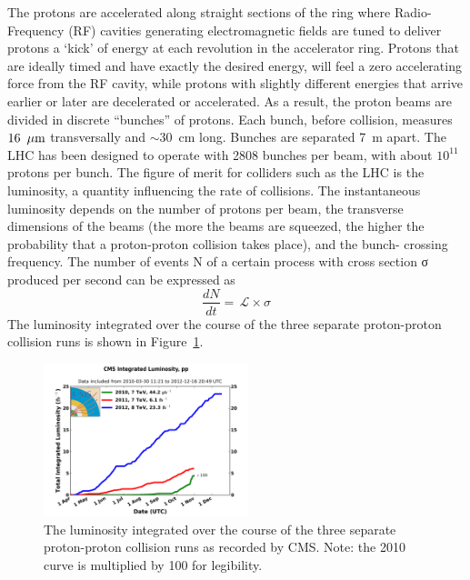 \indent The protons are accelerated along straight sections of the ring where 
Radio-Frequency (RF) cavities generating electromagnetic fields are 
tuned to deliver protons a ‘kick’ of energy at each revolution in the accelerator ring. 
Protons that are ideally timed and have exactly the desired energy, will feel 
a zero accelerating force from the RF cavity, while protons with slightly different 
energies that arrive earlier or later are decelerated or accelerated. As a result, 
the proton beams are divided in discrete ``bunches'' of protons. Each bunch, before collision,
measures $16~\,\mu\text{m}$ transversally and $\sim\!\!30$~cm long. Bunches are separated 7~m apart.
The LHC has been designed to operate with 2808 bunches per beam, with about $10^{11}$ protons per bunch. 
The figure of merit for colliders such as the LHC is the luminosity, a quantity 
influencing the rate of collisions. The instantaneous luminosity depends on the number of protons
per beam, the transverse dimensions of the beams (the more the beams are squeezed,
the higher the probability that a proton-proton collision takes place), and the bunch-
crossing frequency. The number of events N of a certain process with cross section σ
produced per second can be expressed as
%
\begin{equation}
  \label{eq:lumi}
  \frac{dN}{dt} = \,\mathcal{L} \times \sigma
\end{equation}
%
The luminosity integrated over the course of the three separate proton-proton collision runs
is shown in Figure~\ref{fig:int_lumi}. 

\begin{figure}[h!]
  \begin{center}
      \includegraphics[width=0.53\textwidth,]{figures/int_lumi_cumulative_pp_2.png}
      \caption{\label{fig:int_lumi} The luminosity integrated over the course of the three 
      separate proton-proton collision runs as recorded by CMS.  
      Note: the 2010 curve is multiplied by 100 for legibility.}
  \end{center}
\end{figure}

